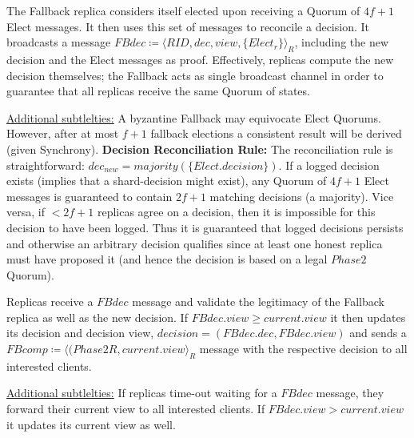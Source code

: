 The Fallback replica considers itself elected upon receiving a Quorum of $4f+1$ Elect messages. It then uses this set of messages to reconcile a decision. It broadcasts a message $FBdec \coloneqq \langle RID, dec, view, \{Elect_r\} \rangle_R$, including the new decision and the Elect messages as proof. Effectively, replicas compute the new decision themselves; the Fallback acts as single broadcast channel in order to guarantee that all replicas receive the same Quorum of states.

\underline{Additional subtlelties:} A byzantine Fallback may equivocate Elect Quorums. However, after at most $f+1$ fallback elections a consistent result will be derived (given Synchrony).
\textbf{Decision Reconciliation Rule:} The reconciliation rule is straightforward: $dec_{new} = majority(\{Elect.decision\})$. If a logged decision exists (implies that a shard-decision might exist), any Quorum of $4f+1$ Elect messages is guaranteed to contain $2f+1$ matching decisions (a majority). Vice versa, if $<2f+1$ replicas agree on a decision, then it is impossible for this decision to have been logged. Thus it is guaranteed that logged decisions persists and otherwise an arbitrary decision qualifies since at least one honest replica must have proposed it (and hence the decision is based on a legal $Phase2$ Quorum).



Replicas receive a $FBdec$ message and validate the legitimacy of the Fallback replica as well as the new decision. If $FBdec.view \geq current.view$ it then updates its decision and decision view, $decision = (FBdec.dec, FBdec.view)$ and sends a $FBcomp \coloneqq \langle(Phase2R, current.view\rangle_R$ message with the respective decision to all interested clients.

\underline{Additional subtlelties:} If replicas time-out waiting for a $FBdec$ message, they forward their current view to all interested clients. If $FBdec.view > current.view$ it updates its current view as well.

